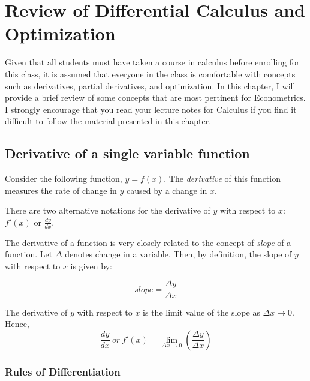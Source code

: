 \documentclass[]{book}
\theoremstyle{definition}
\theoremstyle{definition}
\theoremstyle{definition}
\theoremstyle{remark}
\let\BeginKnitrBlock\begin \let\EndKnitrBlock\end
\begin{document}
\hypertarget{review-of-differential-calculus-and-optimization}{%
\chapter{Review of Differential Calculus and Optimization}\label{review-of-differential-calculus-and-optimization}}

Given that all students must have taken a course in calculus before enrolling for this class, it is assumed that everyone in the class is comfortable with concepts such as derivatives, partial derivatives, and optimization. In this chapter, I will provide a brief review of some concepts that are most pertinent for Econometrics. I strongly encourage that you read your lecture notes for Calculus if you find it difficult to follow the material presented in this chapter.

\hypertarget{derivative-of-a-single-variable-function}{%
\section{Derivative of a single variable function}\label{derivative-of-a-single-variable-function}}

\BeginKnitrBlock{definition}[Derivative of a function]
\protect\hypertarget{def:unnamed-chunk-13}{}{\label{def:unnamed-chunk-13} {} }Consider the following function, \(y=f(x)\). The \emph{derivative} of this function measures the rate of change in \(y\) caused by a change in \(x\).
\EndKnitrBlock{definition}

There are two alternative notations for the derivative of \(y\) with respect to \(x\): \(f'(x)\) or \(\displaystyle{\frac{dy}{dx}}\).

The derivative of a function is very closely related to the concept of \emph{slope} of a function. Let \(\Delta\) denotes change in a variable. Then, by definition, the slope of \(y\) with respect to \(x\) is given by:

\[slope=\frac{\Delta y}{\Delta x}\]

The derivative of \(y\) with respect to \(x\) is the limit value of the slope as \(\Delta x \rightarrow 0\). Hence,
\[\frac{dy}{dx} \ or \ f'(x)=\lim_{\Delta x \to 0} \left( \frac{\Delta y}{\Delta x}\right) \]

\hypertarget{rules-of-differentiation}{%
\subsection{Rules of Differentiation}\label{rules-of-differentiation}}
\end{document}
